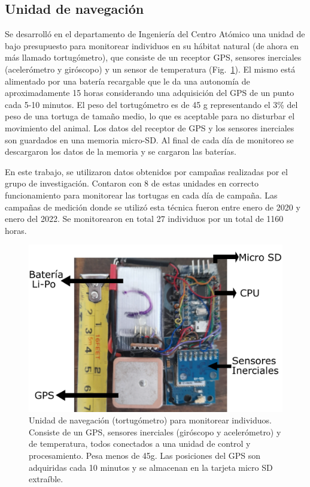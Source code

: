 \subsection{Unidad de navegación}
Se desarrolló en el departamento de Ingeniería del Centro Atómico  una unidad de bajo presupuesto para monitorear individuos en su hábitat natural (de ahora en más llamado tortugómetro), que consiste de un receptor GPS, sensores inerciales (acelerómetro y giróscopo) y un sensor de temperatura (Fig.~\ref{fig:tortugometro}). El mismo está alimentado por una batería recargable que le da una autonomía de aproximadamente 15 horas considerando una adquisición del GPS de un punto cada 5-10 minutos. El peso del tortugómetro es de 45 g representando el 3\% del peso de una tortuga de tamaño medio, lo que es aceptable para no disturbar el movimiento del animal. Los datos del receptor de GPS y los sensores inerciales son guardados en una memoria micro-SD. Al final de cada día de monitoreo se descargaron los datos de la memoria y se cargaron las baterías.
 
En este trabajo, se utilizaron datos obtenidos por campañas realizadas por el grupo de investigación. Contaron con 8 de estas unidades en correcto funcionamiento para monitorear las tortugas en cada día de campaña. Las campañas de medición donde se utilizó esta técnica fueron entre enero de 2020 y enero del 2022. Se monitorearon en total 27 individuos por un total de 1160 horas.
\begin{figure}[ht]
    \begin{center}
       
   
    \includegraphics[width=\imsize]{figs/Chap1/tortugometro.pdf}  
\end{center}
    \caption[Unidad de navegación (tortugómetro) para monitorear individuos.] {Unidad de navegación (tortugómetro) para monitorear individuos. Consiste de un GPS, sensores inerciales (giróscopo y acelerómetro) y de temperatura, todos conectados a una unidad de control y procesamiento. Pesa menos de 45g. Las posiciones del GPS son adquiridas cada 10 minutos y se almacenan en la tarjeta micro SD extraíble. }
    \label{fig:tortugometro}
\end{figure}
 
